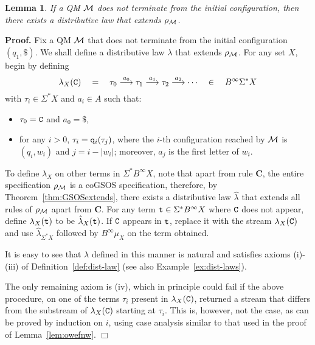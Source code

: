\documentclass[adraft,copyright,creativecommons]{eptcs}
\newtheorem{lemma}[theorem]{Lemma}
\newenvironment{proof}[1][Proof]{\noindent\textbf{#1.} }{{\hfill $\Box$ \\}}
\newcommand{\Bb}{B^{\infty}}
\newcommand{\Ss}{\Sigma^*}
\newcommand{\goes}[1]{\stackrel{#1}{\longrightarrow}}
\begin{document}
\begin{lemma}\label{lem:awonbaerb}\rm
If a QM ${\cal M}$ does not terminate from the initial configuration, then there exists a distributive law that extends $\rho_{\cal M}$.
\end{lemma}
\begin{proof}
Fix a QM ${\cal M}$ that does not terminate from the initial configuration $(q_1,\$)$. We shall define a distributive law $\lambda$ that extends $\rho_{\cal M}$. For any set $X$, begin by defining
\[
	\lambda_X({\tt C})  \quad = \quad \tau_0 \goes{a_0} \tau_1\goes{a_1}\tau_2\goes{a_2}\cdots \quad \in \quad \Bb \Ss X
\]
with $\tau_i\in\Ss X$ and $a_i\in A$ such that:
\begin{itemize}
\item $\tau_0={\tt C}$ and $a_0=\$$, 
\item for any $i>0$, $\tau_i={\tt q}_i(\tau_j)$, where the $i$-th configuration reached by ${\cal M}$ is $(q_i,w_i)$ and $j=i-|w_i|$; moreover, $a_j$ is the first letter of $w_i$.
\end{itemize} 
To define $\lambda_X$ on other terms in $\Ss \Bb X$, note that apart from rule {\bf C}, the entire specification $\rho_{\cal M}$ is a coGSOS specification, therefore, by Theorem~\ref{thm:GSOSextends}, there exists a distributive law $\hat\lambda$ that extends all rules of $\rho_{\cal M}$ apart from {\bf C}. For any term ${\tt t}\in\Ss\Bb X$ where ${\tt C}$ does not appear, define $\lambda_X({\tt t})$ to be $\hat\lambda_X({\tt t})$. If ${\tt C}$ appears in ${\tt t}$, replace it with the stream $\lambda_X({\tt C})$ and use $\hat\lambda_{\Ss X}$ followed by $\Bb\mu_X$ on the term obtained.

It is easy to see that $\lambda$ defined in this manner is natural and satisfies axioms (i)-(iii) of Definition~\ref{def:dist-law} (see also Example~\ref{ex:dist-laws}). 

The only remaining axiom is (iv), which in principle could fail if the above procedure, on one of the terms $\tau_i$ present in $\lambda_X({\tt C})$, returned a stream that differs from the substream of $\lambda_X({\tt C})$ starting at $\tau_i$. This is, however, not the case, as can be proved by induction on $i$, using case analysis similar to that used in the proof of Lemma~\ref{lem:owefnw}.
\end{proof}
\end{document}
